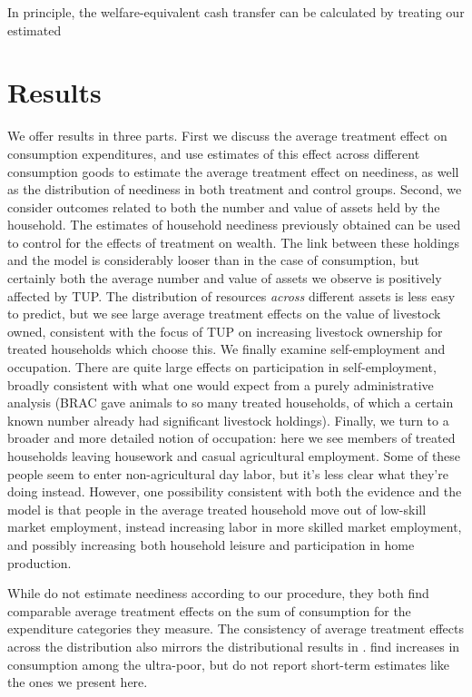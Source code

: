 \documentclass[11pt]{article}
\begin{document}
In principle, the welfare-equivalent cash transfer can be
calculated by treating our estimated

\section*{Results}
\label{sec-8}

We offer results in three parts.  First we discuss the average
treatment effect on consumption expenditures, and use estimates of
this effect across different consumption goods to estimate the average
treatment effect on neediness, as well as the distribution of
neediness in both treatment and control groups.  Second, we consider
outcomes related to both the number and value of assets held by the
household.  The estimates of household neediness previously obtained
can be used to control for the effects of treatment on wealth.  The
link between these holdings and the model is considerably looser than
in the case of consumption, but certainly both the average number and
value of assets we observe is positively affected by TUP.  The
distribution of resources \emph{across} different assets is less easy to
predict, but we see large average treatment effects on the value of
livestock owned, consistent with the focus of TUP on increasing
livestock ownership for treated households which choose this.  We
finally examine self-employment and occupation.  There are quite large
effects on participation in self-employment, broadly consistent with
what one would expect from a purely administrative analysis (BRAC gave
animals to so many treated households, of which a certain known number
already had significant livestock holdings).  Finally, we turn to a
broader and more detailed notion of occupation: here we see members of
treated households leaving housework and casual agricultural
employment.  Some of these people seem to enter non-agricultural day
labor, but it's less clear what they're doing instead.  However, one
possibility consistent with both the evidence and the model is that
people in the average treated household move out of low-skill market
employment, instead increasing labor in more skilled market
employment, and possibly increasing both household leisure and
participation in home production.

While \cite{banerjee2015} do not estimate neediness according to our procedure,
they both find comparable average treatment effects on the sum of 
consumption for the expenditure categories they measure. The consistency of average
treatment effects across the distribution also mirrors the distributional results in
\cite{banerjee2015}. \cite{bandiera2017} find increases in consumption among
the ultra-poor, but do not report short-term estimates like the ones we present here.
\end{document}
